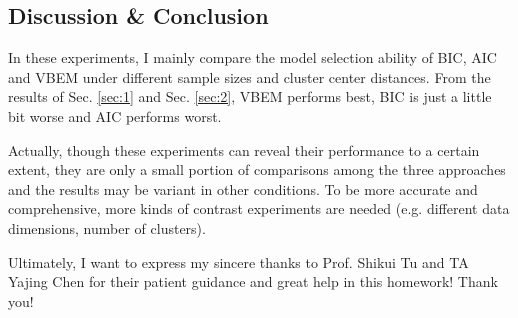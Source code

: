 \documentclass[12pt,a4paper]{article}
\theoremstyle{definition}
\begin{document}
\subsection{Discussion \& Conclusion}

In these experiments, I mainly compare the model selection ability of BIC, AIC and VBEM under different sample sizes and cluster center distances. From the results of Sec. \ref{sec:1} and Sec. \ref{sec:2}, VBEM performs best, BIC is just a little bit worse and AIC performs worst.

Actually, though these experiments can reveal their performance to a certain extent, they are only a small portion of comparisons among the three approaches and the results may be variant in other conditions. To be more accurate and comprehensive, more kinds of contrast experiments are needed (e.g. different data dimensions, number of clusters).

Ultimately, I want to express my sincere thanks to Prof. Shikui Tu and TA Yajing Chen for their patient guidance and great help in this homework! Thank you!

\end{document}
